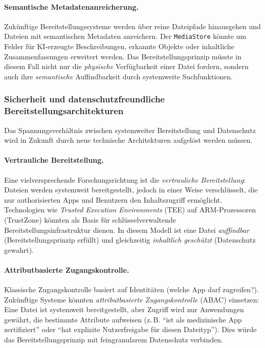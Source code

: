 ﻿\documentclass[12pt, a4paper]{article}
\begin{document}
\paragraph{Semantische Metadatenanreicherung.}
Zukünftige Bereitstellungssysteme werden über reine Dateipfade hinausgehen und Dateien
mit semantischen Metadaten anreichern. Der \texttt{MediaStore} könnte um Felder für
KI-erzeugte Beschreibungen, erkannte Objekte oder inhaltliche Zusammenfassungen erweitert
werden. Das Bereitstellungsprinzip müsste in diesem Fall nicht nur die \emph{physische}
Verfügbarkeit einer Datei fordern, sondern auch ihre \emph{semantische} Auffindbarkeit
durch systemweite Suchfunktionen.

\subsubsection{Sicherheit und datenschutzfreundliche Bereitstellungsarchitekturen}

Das Spannungsverhältnis zwischen systemweiter Bereitstellung und Datenschutz wird in
Zukunft durch neue technische Architekturen aufgelöst werden müssen.

\paragraph{Vertrauliche Bereitstellung.}
Eine vielversprechende Forschungsrichtung ist die \emph{vertrauliche Bereitstellung}:
Dateien werden systemweit bereitgestellt, jedoch in einer Weise verschlüsselt, die nur
authorisierten Apps und Benutzern den Inhaltszugriff ermöglicht. Technologien wie
\emph{Trusted Execution Environments} (TEE) auf ARM-Prozessoren (TrustZone) könnten
als Basis für schlüsselverwaltende Bereitstellungsinfrastruktur dienen. In diesem Modell
ist eine Datei \emph{auffindbar} (Bereitstellungsprinzip erfüllt) und gleichzeitig
\emph{inhaltlich geschützt} (Datenschutz gewahrt).

\paragraph{Attributbasierte Zugangskontrolle.}
Klassische Zugangskontrolle basiert auf Identitäten (welche App darf zugreifen?).
Zukünftige Systeme könnten \emph{attributbasierte Zugangskontrolle} (ABAC) einsetzen:
Eine Datei ist systemweit bereitgestellt, aber Zugriff wird nur Anwendungen gewährt,
die bestimmte Attribute aufweisen (z.\,B. \enquote{ist als medizinische App zertifiziert}
oder \enquote{hat explizite Nutzerfreigabe für diesen Dateityp}). Dies würde das
Bereitstellungsprinzip mit feingranularem Datenschutz verbinden.
\end{document}
